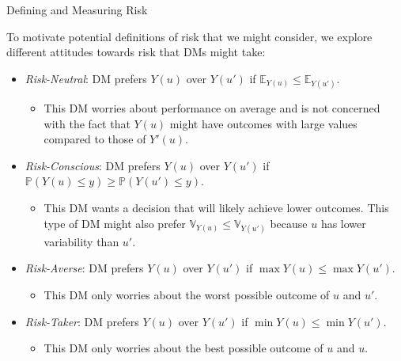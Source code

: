 \documentclass[handout,9pt]{beamer}
\begin{document}
%
\begin{frame}{Defining and Measuring Risk}

To motivate potential definitions of risk that we might consider, we explore different attitudes towards risk that DMs might take: 

\begin{block}{}
\begin{itemize}
   \setlength{\itemsep}{10pt}
\item {\em Risk-Neutral}: DM prefers $Y(u)$ over $Y(u')$ if $\mathbb{E}_{Y(u)}\leq \mathbb{E}_{Y(u')}$.  

\begin{itemize}
\item This DM worries about performance on average and is not concerned with the fact that $Y(u)$ might have outcomes with large values compared to those of $Y'(u)$. 
\end{itemize}
\item {\em Risk-Conscious}: DM prefers $Y(u)$ over $Y(u')$ if $\mathbb{P}(Y(u)\leq y)\geq \mathbb{P}(Y(u')\leq y)$.  

\begin{itemize}
\item This DM wants a decision that will likely achieve lower outcomes. This type of DM might also prefer $\mathbb{V}_{Y(u)}\leq \mathbb{V}_{Y(u')}$ because $u$ has lower variability than $u'$.
\end{itemize}
\item {\em Risk-Averse}: DM prefers $Y(u)$ over $Y(u')$ if $\max  Y(u)\leq \max Y(u')$.  

\begin{itemize}
\item This DM only worries about the worst possible outcome of $u$ and $u'$.
\end{itemize}
\item {\em Risk-Taker}: DM prefers $Y(u)$ over $Y(u')$ if $\min Y(u)\leq \min Y(u')$.  

\begin{itemize}
\item This DM only worries about the best possible outcome of $u$ and $u$.
\end{itemize}

\end{itemize}
\end{block}


\end{frame}
\end{document}
